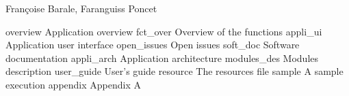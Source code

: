 %
%
%
%
%
%
%
%
%
%


 {Fran\c{c}oise Barale, Faranguiss Poncet}


\disclaimer

\TOC
\newpage

	{overview}	{Application overview}
		{fct_over}	{Overview of the functions}
	\newpage
		{appli_ui}	{Application user interface}
	\newpage
		{open_issues}	{Open issues}
\newpage
{}	{soft_doc}	{Software documentation}
		{appli_arch}	{Application architecture}
	\newpage
		{modules_des}	{Modules description}
\newpage
{}	{user_guide}	{User's guide}
		{resource}	{The resources file}
	\newpage
		{sample}	{A sample execution}
\newpage
{}  {appendix}      {Appendix A}



